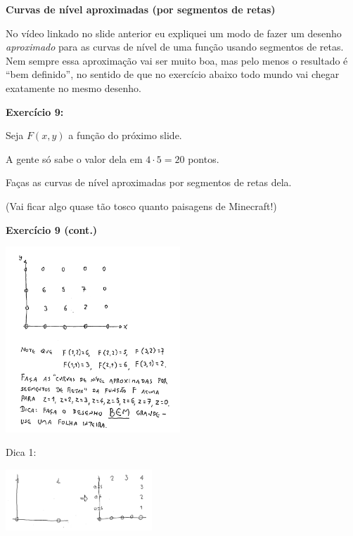 \documentclass[oneside,12pt]{article}
\begin{document}
{\bf Curvas de nível aproximadas (por segmentos de retas)}

No vídeo linkado no slide anterior eu expliquei um modo de fazer um
desenho {\sl aproximado} para as curvas de nível de uma função usando
segmentos de retas. Nem sempre essa aproximação vai ser muito boa, mas
pelo menos o resultado é ``bem definido'', no sentido de que no
exercício abaixo todo mundo vai chegar exatamente no mesmo desenho.

\msk

{\bf Exercício 9:}

Seja $F(x,y)$ a função do próximo slide.

A gente só sabe o valor dela em $4·5=20$ pontos.

Faças as curvas de nível aproximadas por segmentos de retas dela.

(Vai ficar algo quase tão tosco quanto paisagens de Minecraft!)

\newpage

{\bf Exercício 9 (cont.)}



\includegraphics[height=7cm]{2020-2-C3/20210317_curva_de_nivel.pdf}

\newpage


Dica 1:


\includegraphics[width=5.5cm]{2020-2-C3/20210317_curvas_de_nivel_2.pdf}
\end{document}
